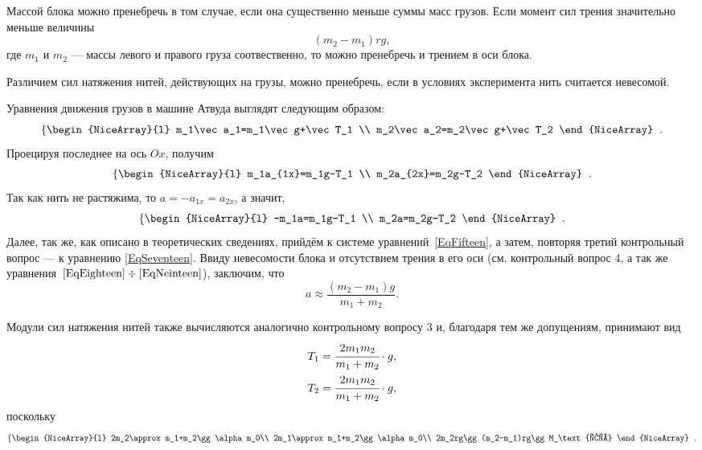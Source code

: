 \begin{Enumerate}
	\item Массой блока можно пренебречь в том случае, если она существенно меньше суммы масс грузов. Если момент сил трения значительно меньше величины
	\[
	(m_2-m_1)rg,
	\]
	где $m_1$ и $m_2$ --- массы левого и правого груза соотвественно, то можно пренебречь и трением в оси блока.
	
	\item Различием сил натяжения нитей, действующих на грузы, можно пренебречь, если в условиях эксперимента нить считается невесомой.
	
	\item Уравнения движения грузов в машине Атвуда выглядят следующим образом:
	\[
	\left\{
	\begin{NiceArray}{l}
		m_1\vec a_1=m_1\vec g+\vec T_1 \\
		m_2\vec a_2=m_2\vec g+\vec T_2
	\end{NiceArray}
	\right.\;.
	\]
	Проецируя последнее на ось $Ox$, получим
	\[
	\left\{
	\begin{NiceArray}{l}
		m_1a_{1x}=m_1g-T_1 \\
		m_2a_{2x}=m_2g-T_2
	\end{NiceArray}
	\right.\;.
	\]
	Так как нить не растяжима, то $a=-a_{1x}=a_{2x}$, а значит,
	\[
	\left\{
	\begin{NiceArray}{l}
		-m_1a=m_1g-T_1 \\
		m_2a=m_2g-T_2
	\end{NiceArray}
	\right.\;.
	\]
	Далее, так же, как описано в теоретических сведениях, прийдём к системе уравнений~\eqref{EqFifteen}, а затем, повторяя третий контрольный вопрос --- к уравнению \eqref{EqSeventeen}. Ввиду невесомости блока и отсутствием трения в его оси (см. контрольный вопрос 4, а так же уравнения~$\eqref{EqEighteen}\div\eqref{EqNeinteen}$), заключим, что
	\[
	a\approx\frac{(m_2-m_1)g}{m_1+m_2}.
	\]
	
	Модули сил натяжения нитей также вычисляются аналогично контрольному вопросу 3 и, благодаря тем же допущениям, принимают вид
	\begin{gather*}
		T_1=\cfrac{2m_1m_2}{m_1+m_2}\cdot g, \\
		T_2=\cfrac{2m_1m_2}{m_1+m_2}\cdot g,
	\end{gather*}
	поскольку
	\[
	\left\{
	\begin{NiceArray}{l}
		2m_2\approx m_1+m_2\gg\alpha m_0\\
		2m_1\approx m_1+m_2\gg\alpha m_0\\
		2m_2rg\gg(m_2-m_1)rg\gg M_\text{тр}
	\end{NiceArray}
	\right.\;.
	\]
	

\end{Enumerate}
